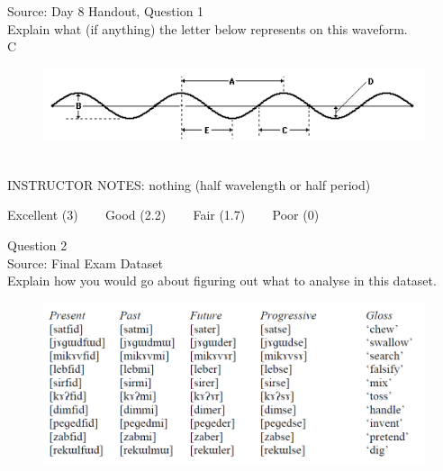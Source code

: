 \documentclass[12pt]{article}
\begin{document}
Source: Day 8 Handout, Question 1\\

Explain what (if anything) the letter below represents on this waveform.\\

C

\begin{figure}[H]
\includegraphics{../images/sinusoid.png}
\end{figure}

~\\
INSTRUCTOR NOTES: nothing (half wavelength or half period)


\vfill
Excellent (3) ~~~ Good (2.2) ~~~ Fair (1.7) ~~~ Poor (0)
\newpage

{\large Question 2}\\

Source: Final Exam Dataset\\

Explain how you would go about figuring out what to analyse in this dataset.\\

\begin{figure}[H]
\includegraphics{../images/final_dataset.png}
\end{figure}
\end{document}
